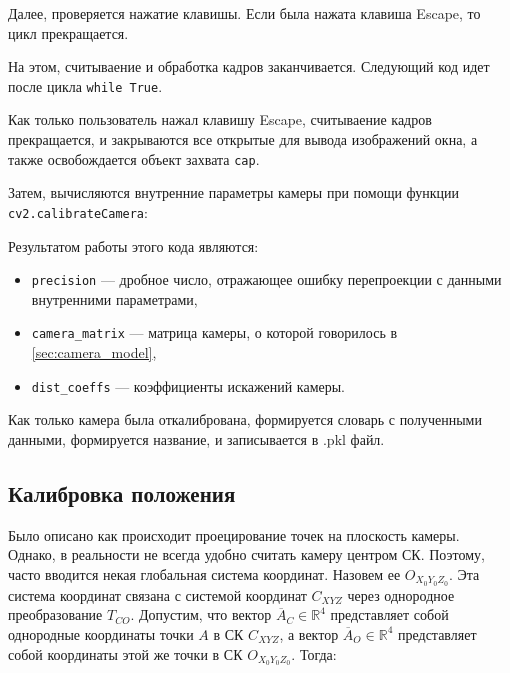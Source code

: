 \documentclass[12pt, a4paper]{article}
\begin{document}
Далее, проверяется нажатие клавишы. Если была нажата клавиша Escape, то цикл прекращается.

На этом, считываение и обработка кадров заканчивается. Следующий код идет после цикла \texttt{while True}.

Как только пользователь нажал клавишу Escape, считываение кадров прекращается,
и закрываются все открытые для вывода изображений окна, а также освобождается
объект захвата \texttt{cap}.

Затем, вычисляются внутренние параметры камеры при помощи функции\\
\texttt{cv2.calibrateCamera}:


Результатом работы этого кода являются:
\begin{itemize}
  \item \texttt{precision} --- дробное число, отражающее ошибку перепроекции с данными внутренними параметрами,
  \item \texttt{camera\_matrix} --- матрица камеры, о которой говорилось в \ref{sec:camera_model},
  \item \texttt{dist\_coeffs} --- коэффициенты искажений камеры.
\end{itemize}

Как только камера была откалибрована, формируется словарь с полученными данными, формируется название, и записывается в .pkl файл.

    

\subsection{Калибровка положения}
\label{sec:position-calib}

Было описано как происходит проецирование точек на плоскость камеры. Однако, в
реальности не всегда удобно считать камеру центром СК. Поэтому, часто вводится
некая глобальная система координат. Назовем ее $O_{X_0Y_0Z_0}$. Эта система
координат связана с системой координат $C_{XYZ}$ через однородное
преобразование $T_{CO}$. Допустим, что вектор $\overline{A}_C \in \mathbb{R}^4$
представляет собой однородные координаты точки $A$ в СК $C_{XYZ}$, а вектор
$\overline{A}_O \in \mathbb{R}^4$ представляет собой координаты этой же точки в
СК $O_{X_0Y_0Z_0}$. Тогда:
\end{document}
